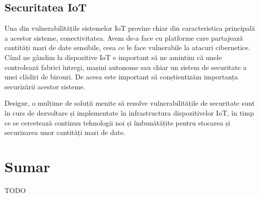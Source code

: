 \subsection{Securitatea IoT}
\label{sec:embed-iot-security}

Una din vulnerabilitățile sistemelor IoT provine chiar din caracteristica
principală a acestor sisteme, conectivitatea. Avem de-a face cu platforme care
partajează cantități mari de date sensibile, ceea ce le face vulnerabile la
atacuri cibernetice. Când ne gândim la dispozitive IoT e important să ne amintim
că unele controlează fabrici întregi, mașini autonome sau chiar un sistem de
securitate a unei clădiri de birouri. De aceea este important să conștientizăm
importanța securizării acestor sisteme.

Desigur, o mulțime de soluții menite să rezolve vulnerabilitățile de securitate
sunt în curs de dezvoltare și implementate în infrastructura dispozitivelor IoT,
în timp ce se cercetează continuu tehnologii noi și îmbunătățite pentru stocarea
și securizarea unor cantități mari de date.

\section{Sumar}
\label{sec:embed-sumar}

TODO
